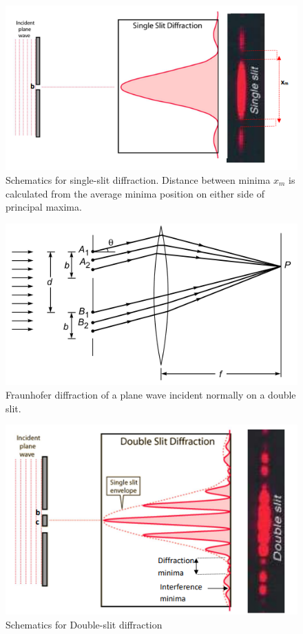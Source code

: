 \documentclass{article}
\begin{document}
\begin{figure}
    \centering
    \includegraphics[scale = 0.75]{Figures/snglschematics.png}
    \captionsetup{justification=centering}
    \caption{Schematics for single-slit diffraction. Distance between minima $x_m$ is calculated from the average minima position on either side of principal maxima.}
    \label{fig:snglschem}
\end{figure}
\begin{figure}
    \centering
    \includegraphics[scale = 0.65]{Figures/doubleslit.png}
    \captionsetup{justification=centering}
    \caption{Fraunhofer diffraction of a plane wave incident normally on a double slit.}
    \label{fig:dblslit}
\end{figure}
\begin{figure}
    \centering
    \includegraphics[scale = 0.75]{Figures/dblschematics.png}
    \captionsetup{justification=centering}
    \caption{Schematics for Double-slit diffraction}
    \label{fig:dblschem}
\end{figure}
\end{document}
